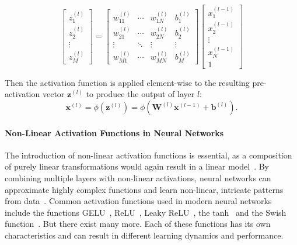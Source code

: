 \begin{equation}
	\begin{bmatrix}
		z_1^{(l)} \\
		z_2^{(l)} \\
		\vdots \\
		z_M^{(l)}
	\end{bmatrix}
	=
	\begin{bmatrix}
		w_{11}^{(l)} & \cdots & w_{1N}^{(l)} & b_1^{(l)} \\
		w_{21}^{(l)} & \cdots & w_{2N}^{(l)} & b_2^{(l)} \\
		\vdots & \ddots & \vdots & \vdots \\
		w_{M1}^{(l)} & \cdots & w_{MN}^{(l)} & b_M^{(l)}
		\end{bmatrix}
		\begin{bmatrix}
		x_1^{(l-1)} \\
		x_2^{(l-1)} \\
		\vdots \\
		x_N^{(l-1)} \\
		1
	\end{bmatrix}
\end{equation}


Then the activation function is applied element-wise to the resulting pre-activation vector $\mathbf{z}^{(l)}$ to produce the output of layer $l$:
\begin{equation}
	\mathbf{x}^{(l)} = \phi(\mathbf{z}^{(l)}) = \phi\!\left(\mathbf{W}^{(l)} \mathbf{x}^{(l-1)} + \mathbf{b}^{(l)}\right).
\end{equation}



\paragraph{Non-Linear Activation Functions in Neural Networks}
The introduction of non-linear activation functions is essential, as a composition of purely linear transformations would again result in a linear model~\cite{Goodfellow-et-al-2016}. By combining multiple layers with non-linear activations, neural networks can approximate highly complex functions and learn non-linear, intricate patterns from data~\cite{Hornik1991ApproximationCO}. 
Common activation functions used in modern neural networks include the functions GELU~\cite{Hendrycks2016GaussianEL}, ReLU~\cite{Nair2010RectifiedLU}, Leaky ReLU~\cite{Maas2013RectifierNI}, the tanh~\cite{Ryck2021OnTA} and the Swish function~\cite{Ramachandran2017SwishAS}. But there exist many more. Each of these functions has its own characteristics and can result in different learning dynamics and performance. 





